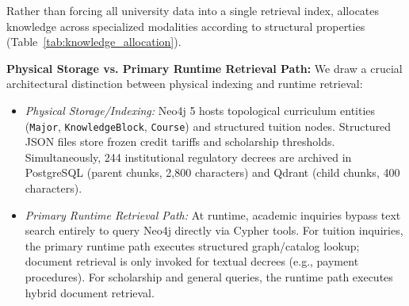Rather than forcing all university data into a single retrieval index, \system{} allocates knowledge across specialized modalities according to structural properties (Table~\ref{tab:knowledge_allocation}).

\begin{table}[!htbp]
\centering
\caption{Heterogeneous knowledge allocation across institutional administrative domains.}
\label{tab:knowledge_allocation}
\end{table}

\textbf{Physical Storage vs. Primary Runtime Retrieval Path:} We draw a crucial architectural distinction between physical indexing and runtime retrieval:
\begin{itemize}
    \item \emph{Physical Storage/Indexing:} Neo4j 5 hosts topological curriculum entities (\texttt{Major}, \texttt{KnowledgeBlock}, \texttt{Course}) and structured tuition nodes. Structured JSON files store frozen credit tariffs and scholarship thresholds. Simultaneously, 244 institutional regulatory decrees are archived in PostgreSQL (parent chunks, 2,800 characters) and Qdrant (child chunks, 400 characters).
    \item \emph{Primary Runtime Retrieval Path:} At runtime, academic inquiries bypass text search entirely to query Neo4j directly via Cypher tools. For tuition inquiries, the primary runtime path executes structured graph/catalog lookup; document retrieval is only invoked for textual decrees (e.g., payment procedures). For scholarship and general queries, the runtime path executes hybrid document retrieval.
\end{itemize}

